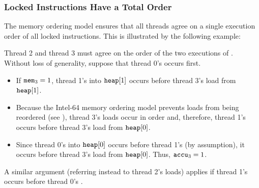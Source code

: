 \newpage

\subsubsection*{Locked Instructions Have a Total Order}

The memory ordering model ensures that all threads agree on a single execution order of all locked instructions.
This is illustrated by the following example:

\begin{table}[!hbt]
\noindent{}
\caption[Locked Instructions Have a Total Order]{Locked Instructions Have a Total Order \cite[Example 8-8]{ref:Intel}}
\label{tbl:litmus:intel:8}
\end{table}

\noindent
Thread 2 and thread 3 must agree on the order of the two executions of .
Without loss of generality, suppose that thread 0’s  occurs first.
\begin{itemize}
  \item If $\texttt{mem}_3 = 1$, thread 1’s  into $\texttt{heap}[1]$ occurs before thread 3’s load from $\texttt{heap}[1]$.
  \item Because the Intel-64 memory ordering model prevents loads from being reordered (see \cite[Section 8.2.3.2]{ref:Intel}), thread 3’s loads occur in order and, therefore, thread 1’s  occurs before thread 3’s load from $\texttt{heap}[0]$.
  \item Since thread 0’s  into $\texttt{heap}[0]$ occurs before thread 1’s  (by assumption), it occurs before thread 3’s load from $\texttt{heap}[0]$.
  Thus, $\texttt{accu}_3 = 1$.
\end{itemize}
A similar argument (referring instead to thread 2’s loads) applies if thread 1’s  occurs before thread 0’s .

